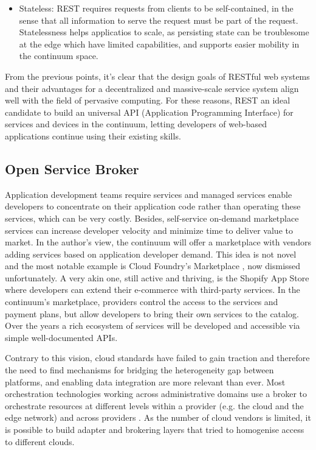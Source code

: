 \documentclass{ieeeaccess}
\begin{document}
\begin{itemize}
    \item Stateless: REST requires requests from clients to be self-contained, in the sense that all information to serve the request must be part of the request. Statelessness helps applicatios to scale, as persisting state can be troublesome at the edge which have limited capabilities, and supports easier mobility in the continuum space.
\end{itemize}

From the previous points, it's clear that the design goals of RESTful web systems and their advantages for a decentralized and massive-scale service system align well with the field of pervasive computing. For these reasons, REST an ideal candidate to build an universal API (Application Programming Interface) for services and devices in the continuum, letting developers of web-based applications continue using their existing skills. 

\subsection{Open Service Broker}

Application development teams require services and managed services enable developers to concentrate on their application code rather than operating these services, which can be very costly. Besides, self-service on-demand marketplace services can increase developer velocity and minimize time to deliver value to market. In the author's view, the continuum will offer a marketplace with vendors adding services based on application developer demand. This idea is not novel and the most notable example is Cloud Foundry's Marketplace \cite{cloud-foundry-marketplace}, now dismissed unfortunately. A very akin one, still active and thriving, is the Shopify App Store \cite{shopify} where developers can extend their e-commerce with third-party services. In the continuum's marketplace, providers control the access to the services and payment plans, but allow developers to bring their own services to the catalog. Over the years a rich ecosystem of services will be developed and accessible via simple well-documented APIs.

Contrary to this vision, cloud standards have failed to gain traction and therefore the need to find mechanisms for bridging the heterogeneity gap between platforms, and enabling data integration are more relevant than ever. Most orchestration technologies working across administrative domains use a broker to orchestrate resources at different levels within a provider (e.g. the cloud and the edge network) and across providers \cite{inter-cloud}. As the number of cloud vendors is limited, it is possible to build adapter and brokering layers that tried to homogenise access to different clouds. 
\end{document}
